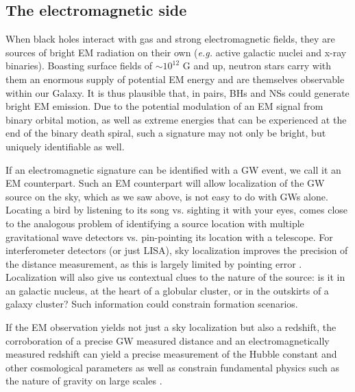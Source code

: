







\subsection{The electromagnetic side} When black holes interact with gas and
strong electromagnetic fields, they are sources of bright EM radiation on
their own (\emph{e.g.} active galactic nuclei and x-ray binaries). Boasting
surface fields of $\sim 10^{12}$ G and up, neutron stars carry with them an
enormous supply of potential EM energy and are themselves observable within
our Galaxy. It is thus plausible that, in pairs, BHs and NSs could generate
bright EM emission. Due to the potential modulation of an EM signal from
binary orbital motion, as well as extreme energies that can be experienced at
the end of the binary death spiral, such a signature may not only be bright,
but uniquely identifiable as well.

If an electromagnetic signature can be identified with a GW event, we call it
an EM counterpart. Such an EM counterpart will allow localization of the GW
source on the sky, which as we saw above, is not easy to do with GWs alone.
Locating a bird by listening to its song vs. sighting it with your eyes, comes
close to the analogous problem of identifying a source location with multiple
gravitational wave detectors vs. pin-pointing its location with a telescope.
For interferometer detectors (or just LISA), sky localization improves the
precision of the distance measurement, as this is largely limited by pointing
error \citep{HughesLDist:2002}. Localization will also give us contextual
clues to the nature of the source: is it in an galactic nucleus, at the heart
of a globular cluster, or in the outskirts of a galaxy cluster? Such
information could constrain formation scenarios.

If the EM observation yields not just a sky localization but also a redshift,
the corroboration of a precise GW measured distance and an electromagnetically
measured redshift can yield a precise measurement of the Hubble constant and
other cosmological parameters \citep{Schutz:1986, KrolakSchutz:1987
,ChernoffFinn:1993, HolzHughes:2005, Dalal:2006, KocsisFrei+2006,
Nissanke:2010} as well as constrain fundamental physics such as the nature of
gravity on large scales \citep{DeffayetMenou:2007}.

